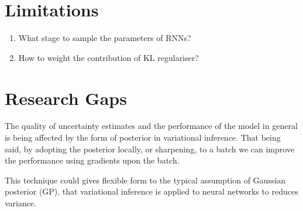 \section{Limitations}
\begin{enumerate}
\item What stage to sample the parameters of RNNs?
\item How to weight the contribution of KL regulariser?
\end{enumerate}

\section{Research Gaps}
The quality of uncertainty estimates and the performance of the model in general is being affected by the form of posterior in variational inference.
That being said, by adopting the posterior locally, or sharpening, to a batch we can improve the performance using gradients upon the batch.

This technique could gives flexible form  to the typical assumption of Gaussian posterior (GP), that variational inference is applied to neural networks to reduces variance.
